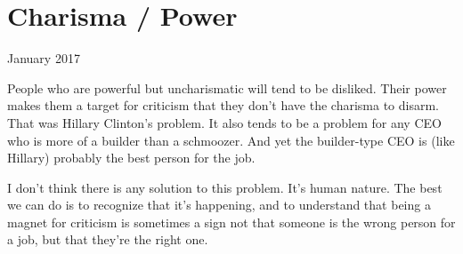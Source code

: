 \chapter{Charisma / Power}


            
              
                

January 2017

People who are powerful but
                  uncharismatic will tend to be disliked. Their power makes them
                  a target for criticism that they don't have the charisma to
                  disarm. That was Hillary Clinton's problem. It also tends to
                  be a problem for any CEO who is more of a builder than a
                  schmoozer. And yet the builder-type CEO is (like Hillary)
                  probably the best person for the job.

I don't think
                  there is any solution to this problem. It's human nature. The
                  best we can do is to recognize that it's happening, and to
                  understand that being a magnet for criticism is sometimes a
                  sign not that someone is the wrong person for a job, but that
                  they're the right one.


              
            
          
            
              
                


                  
              
            
          
